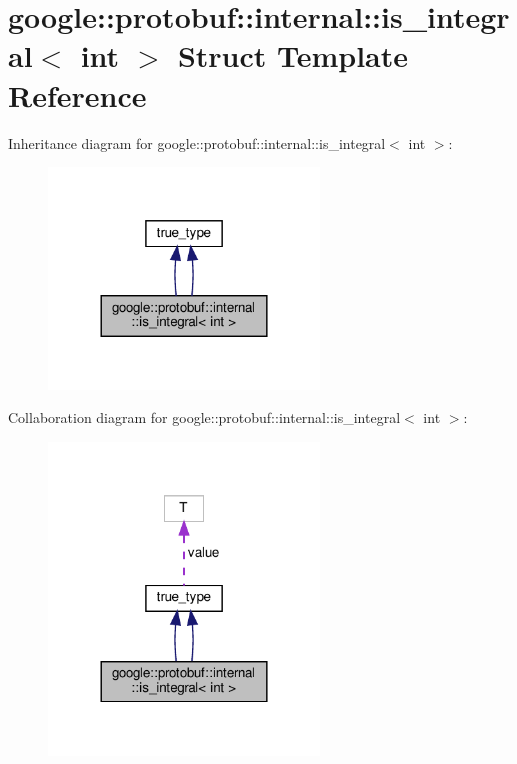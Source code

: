 \hypertarget{structgoogle_1_1protobuf_1_1internal_1_1is__integral_3_01int_01_4}{}\section{google\+:\+:protobuf\+:\+:internal\+:\+:is\+\_\+integral$<$ int $>$ Struct Template Reference}
\label{structgoogle_1_1protobuf_1_1internal_1_1is__integral_3_01int_01_4}


Inheritance diagram for google\+:\+:protobuf\+:\+:internal\+:\+:is\+\_\+integral$<$ int $>$\+:
\nopagebreak
\begin{figure}[H]
\begin{center}
\leavevmode
\includegraphics[width=204pt]{structgoogle_1_1protobuf_1_1internal_1_1is__integral_3_01int_01_4__inherit__graph}
\end{center}
\end{figure}


Collaboration diagram for google\+:\+:protobuf\+:\+:internal\+:\+:is\+\_\+integral$<$ int $>$\+:
\nopagebreak
\begin{figure}[H]
\begin{center}
\leavevmode
\includegraphics[width=204pt]{structgoogle_1_1protobuf_1_1internal_1_1is__integral_3_01int_01_4__coll__graph}
\end{center}
\end{figure}
